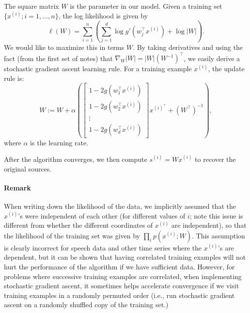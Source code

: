 The square matrix $W$ is the parameter in our model. Given a training
set $\{x^{(i)} ;i = 1,\ldots,n\}$, the log likelihood is given by
\[
    \ell(W) = \sum_{i=1}^n \left( \sum_{j=1}^d \log g'(w^\top_j x^{(i)}) + \log|W| \right).
\]
We would like to maximize this in terms $W$. By taking derivatives and using
the fact (from the first set of notes) that $\nabla_W |W| = |W|(W^{-1})^\top$, we easily
derive a stochastic gradient ascent learning rule. For a training example $x^{(i)}$,
the update rule is:
\[
    W := W + \alpha \left( \begin{bmatrix}
        1 - 2g(w^\top_1 x^{(i)})\\
        1 - 2g(w^\top_2 x^{(i)})\\
        \vdots\\
        1 - 2g(w^\top_d x^{(i)})
    \end{bmatrix} x^{(i)^\top} + (W^\top)^{-1} \right),
\]
where $\alpha$ is the learning rate.

After the algorithm converges, we then compute $s^{(i)} = Wx^{(i)}$ to recover
the original sources.

\paragraph{Remark} When writing down the likelihood of the data, we implicitly
assumed that the $x^{(i)}$'s were independent of each other (for different values
of $i$; note this issue is different from whether the different coordinates of
$x^{(i)}$ are independent), so that the likelihood of the training set was given
by $\prod_i p(x^{(i)}; W)$. This assumption is clearly incorrect for speech data and
other time series where the $x^{(i)}$'s are dependent, but it can be shown that
having correlated training examples will not hurt the performance of the
algorithm if we have sufficient data. However, for problems where successive
training examples are correlated, when implementing stochastic gradient
ascent, it sometimes helps accelerate convergence if we visit training examples
in a randomly permuted order (i.e., run stochastic gradient ascent on a
randomly shuffled copy of the training set.)
